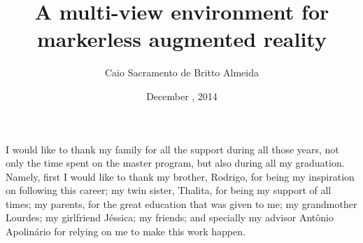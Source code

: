 \documentclass[msc, a4paper, classic, en]{ufbathesis}
\title{A multi-view environment for markerless augmented reality}
\date{December \nth{15}, 2014}
\author{Caio Sacramento de Britto Almeida}
\begin{document}

\frontmatter

\dmccpresentationpage

\catalogingsheet


\acknowledgements
I would like to thank my family for all the support during all those years,
not only the time spent on the master program, but also during all my graduation.
Namely, first I would like to thank my brother, Rodrigo, for being my inspiration on following this career;
my twin sister, Thalita, for being my support of all times;
my parents, for the great education that was given to me;
my grandmother Lourdes; my girlfriend Jéssica; my friends; and specially my advisor Antônio Apolinário
for relying on me to make this work happen.

\end{document}
